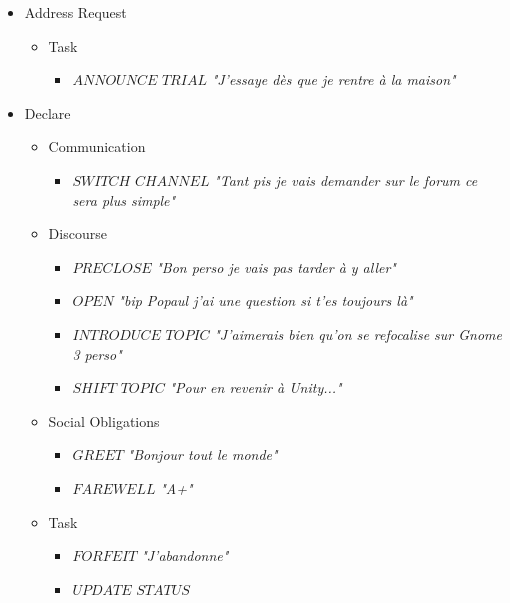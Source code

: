 \begin{itemize}
	\item Address Request
		\begin{itemize}
			\item Task
				\begin{itemize}
					\item $ANNOUNCE$ $TRIAL$
						\newline \textit{"J'essaye dès que je rentre à la maison"}
				\end{itemize}
		\end{itemize}
	\item Declare
		\begin{itemize}
			\item Communication
				\begin{itemize}
					\item $SWITCH$ $CHANNEL$
						\newline \textit{"Tant pis je vais demander sur le forum ce sera plus simple"}
				\end{itemize}
			\item Discourse
				\begin{itemize}
					\item $PRECLOSE$
						\newline \textit{"Bon perso je vais pas tarder à y aller"}
					\item $OPEN$
						\newline \textit{"bip Popaul j'ai une question si t'es toujours là"}
					\item $INTRODUCE$ $TOPIC$
						\newline \textit{"J'aimerais bien qu'on se refocalise sur Gnome 3 perso"}
					\item $SHIFT$ $TOPIC$
						\newline \textit{"Pour en revenir à Unity..."}
				\end{itemize}
			\item Social Obligations
				\begin{itemize}
					\item $GREET$
						\newline \textit{"Bonjour tout le monde"}
					\item $FAREWELL$
						\newline \textit{"A+"}
				\end{itemize}
			\item Task
				\begin{itemize}
					\item $FORFEIT$
						\newline \textit{"J'abandonne"}
					\item $UPDATE$ $STATUS$

\end{itemize}
\end{itemize}
\end{itemize}

